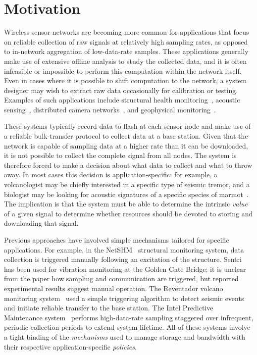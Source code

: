 \section{Motivation}
\label{lance-sec-motivation}

Wireless sensor networks are becoming more common for applications that focus
on reliable collection of raw signals at relatively high sampling rates, as
opposed to in-network aggregation of low-data-rate samples.  These
applications generally make use of extensive offline analysis to study the
collected data, and it is often infeasible or impossible to perform this
computation within the network itself.  Even in cases where it is possible to
shift computation to the network, a system designer may wish to extract raw
data occasionally for calibration or testing.  Examples of such applications
include structural health
monitoring~\cite{netshm-spots06,ggb-ipsn07,wimms-lynch06}, acoustic
sensing~\cite{vango,vigilnet,girod-ipsn07,enviromic}, distributed camera
networks~\cite{cyclops}, and geophysical monitoring~\cite{volcano-osdi06}.

These systems typically record data to flash at each sensor node and make use
of a reliable bulk-transfer protocol to collect data at a base station. Given
that the network is capable of sampling data at a higher rate than it can be
downloaded, it is not possible to collect the complete signal from all nodes.
The system is therefore forced to make a decision about what data to collect
and what to throw away. In most cases this decision is application-specific:
for example, a volcanologist may be chiefly interested in a specific type of
seismic tremor, and a biologist may be looking for acoustic signatures of a
specific species of marmot~\cite{girod-ipsn07}. The implication is that the
system must be able to determine the intrinsic {\em value} of a given signal
to determine whether resources should be devoted to storing and downloading
that signal.

Previous approaches have involved simple mechanisms tailored for specific
applications. For example, in the
NetSHM~\cite{netshm-spots06,netshm-emnets05} structural monitoring system,
data collection is triggered manually following an excitation of the
structure.  Sentri~\cite{ggb-ipsn07} has been used for vibration monitoring
at the Golden Gate Bridge; it is unclear from the paper how sampling and
communication are triggered, but reported experimental results suggest manual
operation. The Reventador volcano monitoring system~\cite{volcano-osdi06}
used a simple triggering algorithm to detect seismic events and initiate
reliable transfer to the base station.  The Intel Predictive Maintenance
system~\cite{intel-northseasensys} performs high-data-rate sampling staggered
over infrequent, periodic collection periods to extend system lifetime.  All
of these systems involve a tight binding of the {\em mechanisms} used to
manage storage and bandwidth with their respective application-specific {\em
policies}.

